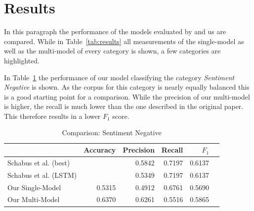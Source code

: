 \documentclass[11pt,a4paper]{article}
\begin{document}
\section{Results}

In this paragraph the performance of the models evaluated by  and us are compared.
While in Table~\ref{tab:results} all measurements of the single-model as well as the multi-model of every category is shown, a few categories are highlighted.

In Table~\ref{tab:results:sentiment_negative} the performance of our model classifying the category \textit{Sentiment Negative} is shown. As the corpus for this category is nearly equally balanced this is a good starting point for a comparison. 
While the precision of our multi-model is higher, the recall is much lower than the one described in the original paper. 
This therefore results in a lower $F_1$ score.
\begin{table}[h!]
	\centering\scriptsize
	\begin{tabular}{l r r r r r}
		& Accuracy & Precision & Recall & $F_1$ \\
		\hline
		Schabus et al. (best) & & 0.5842 & 0.7197 & 0.6137 \\
		Schabus et al. (LSTM) & & 0.5349 & 0.7197 & 0.6137 \\
		\hline
		Our Single-Model & 0.5315 & 0.4912 & 0.6761 & 0.5690 \\
		Our Multi-Model & 0.6370 & 0.6261 & 0.5516 & 0.5865 \\
	\end{tabular}  
	\caption{Comparison: Sentiment Negative}
	\label{tab:results:sentiment_negative}
\end{table}
\end{document}
